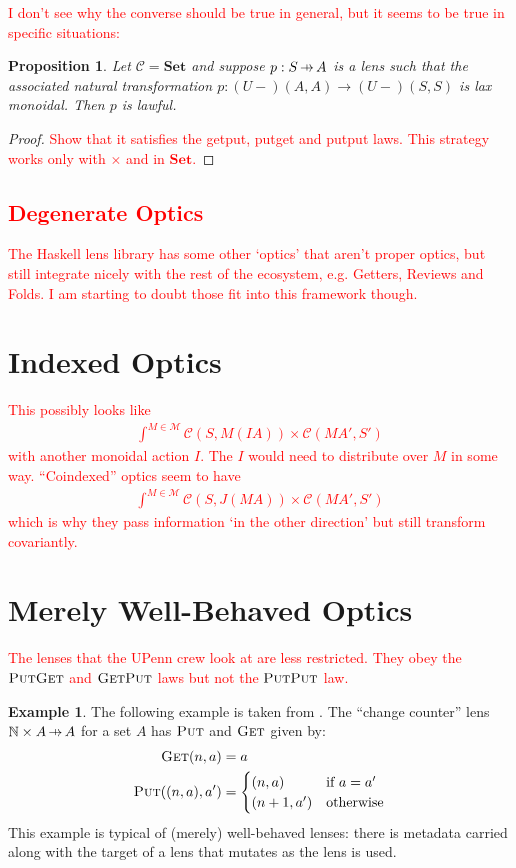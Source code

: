 \documentclass[11pt,a4paper]{article}
\theoremstyle{plain}
\newtheorem{proposition}[theorem]{Proposition}
\theoremstyle{definition}
\newtheorem{example}[theorem]{Example}
\newcommand{\C}{\mathscr{C}}
\newcommand{\M}{\mathscr{M}}
\newcommand{\bN}{\mathbb{N}}
\newcommand{\Set}{\mathbf{Set}}
\newcommand{\fget}{\textsc{Get}}
\newcommand{\fput}{\textsc{Put}}
\newcommand{\hto}{\ensuremath{\,\mathaccent\shortmid\rightarrow\,}}
\newcommand{\todo}[1]{\textcolor{red}{\small #1}}
\begin{document}
\todo{I don't see why the converse should be true in general, but it seems to be true in specific situations:}

\begin{proposition}
Let $\C = \Set$ and suppose $p : S \hto A$ is a lens such that the associated natural transformation $p : (U-)(A,A) \to (U-)(S,S)$ is lax monoidal. Then $p$ is lawful.
\end{proposition}
\begin{proof}
\todo{Show that it satisfies the getput, putget and putput laws. This strategy works only with $\times$ and in $\Set$.}
\end{proof}

\todo{
\section{Degenerate Optics}
The Haskell lens library has some other `optics' that aren't proper optics, but still integrate nicely with the rest of the ecosystem, e.g. Getters, Reviews and Folds. I am starting to doubt those fit into this framework though.}

\section{Indexed Optics}
\todo{
This possibly looks like
\begin{align*}
\int^{M \in \M} \C(S, M(IA)) \times \C(M A', S')
\end{align*}
with another monoidal action $I$. The $I$ would need to distribute over $M$ in some way. ``Coindexed'' optics seem to have 
\begin{align*}
\int^{M \in \M} \C(S, J(MA)) \times \C(M A', S')
\end{align*}
which is why they pass information `in the other direction' but still transform covariantly.
}

\section{Merely Well-Behaved Optics}
\todo{
The lenses that the UPenn crew look at are less restricted. They obey the $\fput\fget$ and $\fget\fput$ laws but not the $\fput\fput$ law. 
}

\begin{example}
The following example is taken from \cite{AClearPictureOfLensLaws}. The ``change counter'' lens $\bN \times A \hto A$ for a set $A$ has $\fput$ and $\fget$ given by:
\begin{align*}
\fget(n, a) &= a \\
\fput((n, a), a') &= \begin{cases}
(n, a) & \text{if } a = a' \\
(n+1, a') & \text{otherwise}
\end{cases}
\end{align*}
This example is typical of (merely) well-behaved lenses: there is metadata carried along with the target of a lens that mutates as the lens is used.
\end{example}
\end{document}
